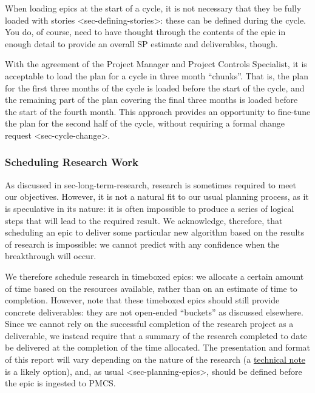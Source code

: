 When loading epics at the start of a cycle, it is not necessary that
they be fully
loaded with stories \textless{}sec-defining-stories\textgreater{}: these
can be defined during the cycle. You do, of course, need to have thought
through the contents of the epic in enough detail to provide an overall
SP estimate and deliverables, though.

With the agreement of the Project Manager and Project Controls
Specialist, it is acceptable to load the plan for a cycle in three month
``chunks''. That is, the plan for the first three months of the cycle is
loaded before the start of the cycle, and the remaining part of the plan
covering the final three months is loaded before the start of the fourth
month. This approach provides an opportunity to fine-tune the plan for
the second half of the cycle, without requiring a formal
change request \textless{}sec-cycle-change\textgreater{}.

\subsubsection{Scheduling Research Work}\label{scheduling-research-work}

As discussed in sec-long-term-research, research is sometimes required
to meet our objectives. However, it is not a natural fit to our usual
planning process, as it is speculative in its nature: it is often
impossible to produce a series of logical steps that will lead to the
required result. We acknowledge, therefore, that scheduling an epic to
deliver some particular new algorithm based on the results of research
is impossible: we cannot predict with any confidence when the
breakthrough will occur.

We therefore schedule research in timeboxed epics: we allocate a certain
amount of time based on the resources available, rather than on an
estimate of time to completion. However, note that these timeboxed epics
should still provide concrete deliverables: they are not open-ended
``buckets'' as discussed elsewhere. Since we cannot rely on the
successful completion of the research project as a deliverable, we
instead require that a summary of the research completed to date be
delivered at the completion of the time allocated. The presentation and
format of this report will vary depending on the nature of the research
(a \href{https://sqr-000.lsst.io/}{technical note} is a likely option),
and, as usual \textless{}sec-planning-epics\textgreater{}, should be
defined before the epic is ingested to PMCS.

